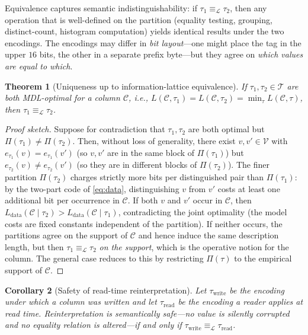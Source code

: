 \documentclass[10pt]{article}
\newtheorem{theorem}{Theorem}
\newtheorem{corollary}[theorem]{Corollary}
\theoremstyle{definition}
\theoremstyle{remark}
\newcommand{\Vcal}{\mathcal{V}}
\newcommand{\Ccal}{\mathcal{C}}
\newcommand{\Tcal}{\mathcal{T}}
\newcommand{\Ldata}{L_{\mathrm{data}}}
\newcommand{\eqL}{\equiv_{\mathcal{L}}}
\begin{document}
Equivalence captures semantic indistinguishability: if $\tau_1 \eqL
\tau_2$, then any operation that is well-defined on the partition
(equality testing, grouping, distinct-count, histogram computation) yields
identical results under the two encodings. The encodings may differ in
\emph{bit layout}---one might place the tag in the upper $16$ bits, the
other in a separate prefix byte---but they agree on \emph{which values are
equal to which}.

\begin{theorem}[Uniqueness up to information-lattice equivalence]\label{thm:unique}
If $\tau_1, \tau_2 \in \Tcal$ are both MDL-optimal for a column $\Ccal$,
i.e., $L(\Ccal, \tau_1) = L(\Ccal, \tau_2) = \min_{\tau} L(\Ccal, \tau)$,
then $\tau_1 \eqL \tau_2$.
\end{theorem}

\begin{proof}[Proof sketch]
Suppose for contradiction that $\tau_1, \tau_2$ are both optimal but
$\Pi(\tau_1) \neq \Pi(\tau_2)$. Then, without loss of generality, there
exist $v, v' \in \Vcal$ with $e_{\tau_1}(v) = e_{\tau_1}(v')$ (so $v, v'$
are in the same block of $\Pi(\tau_1)$) but $e_{\tau_2}(v) \neq
e_{\tau_2}(v')$ (so they are in different blocks of $\Pi(\tau_2)$). The
finer partition $\Pi(\tau_2)$ charges strictly more bits per
distinguished pair than $\Pi(\tau_1)$: by the two-part code of
\cref{eq:data}, distinguishing $v$ from $v'$ costs at least one additional
bit per occurrence in $\Ccal$. If both $v$ and $v'$ occur in $\Ccal$, then
$\Ldata(\Ccal \mid \tau_2) > \Ldata(\Ccal \mid \tau_1)$, contradicting the
joint optimality (the model costs are fixed constants independent of the
partition). If neither occurs, the partitions agree on the support of
$\Ccal$ and hence induce the same description length, but then
$\tau_1 \eqL \tau_2$ \emph{on the support}, which is the operative notion
for the column. The general case reduces to this by restricting
$\Pi(\tau)$ to the empirical support of $\Ccal$.
\end{proof}

\begin{corollary}[Safety of read-time reinterpretation]\label{cor:safe}
Let $\tau_{\mathrm{write}}$ be the encoding under which a column was
written and let $\tau_{\mathrm{read}}$ be the encoding a reader applies
at read time. Reinterpretation is \emph{semantically safe}---no value is
silently corrupted and no equality relation is altered---if and only if
$\tau_{\mathrm{write}} \eqL \tau_{\mathrm{read}}$.
\end{corollary}
\end{document}
